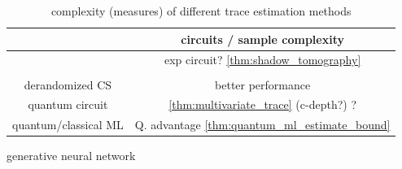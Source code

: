 \documentclass[
reprint,
aps,
pra,
]{revtex4-2}
\theoremstyle{plain}
\newtheorem{theorem}{Theorem}
\theoremstyle{definition}
\newcommand{\dm}{\rho}
\begin{document}
\begin{table}[!ht]
	\centering
	\begin{tabular}{c|c}
		& circuits / sample complexity \\
		\hline
		\nameref{prm:shadow_tomography} & exp circuit?  \cref{thm:shadow_tomography} \\  
		\nameref{def:classical_shadow} &  \\
		derandomized CS &  better performance \\  
		quantum circuit  &  \cref{thm:multivariate_trace} (c-depth?)  ? \\  
		quantum/classical ML  &  Q. advantage 
		\cref{thm:quantum_ml_estimate_bound} \\  
		\hline
	\end{tabular}
	\caption{complexity (measures) of different trace estimation methods}
\end{table}

generative neural network \cite{zhuFlexibleLearningQuantum2022}
	



\end{document}
